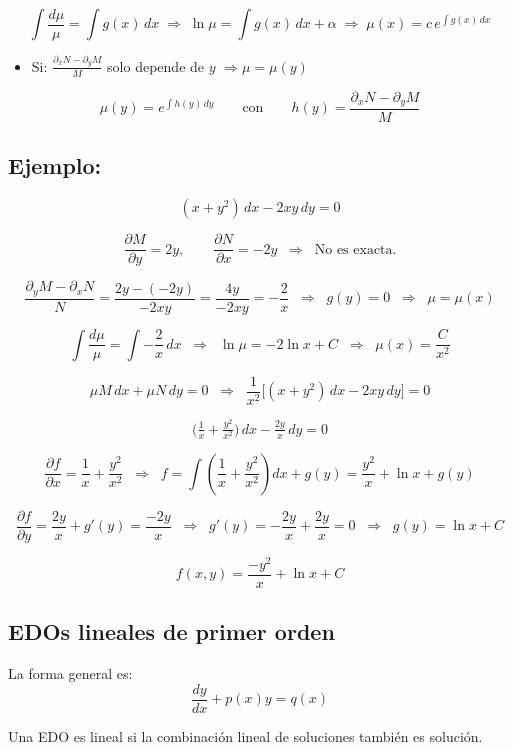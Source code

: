 \documentclass[a4paper,12pt]{article}
\begin{document}
\[
\int \frac{d\mu}{\mu}=\int g(x)\,dx
\;\Rightarrow\;
\ln\mu=\int g(x)\,dx+\alpha
\;\Rightarrow\;
\mu(x)=c\,e^{\int g(x)\,dx}
\]

\begin{itemize}
\item Si: $\displaystyle \frac{\partial_x N-\partial_y M}{M}$ solo depende de $y$ $\Rightarrow \mu=\mu(y)$
\end{itemize}

\[
\mu(y)=e^{\int h(y)\,dy}
\qquad\text{con}\qquad
h(y)=\frac{\partial_x N-\partial_y M}{M}
\]
\newpage
\subsection*{Ejemplo:}

\[
(x+y^2)\,dx - 2xy\,dy = 0
\]

\[
\frac{\partial M}{\partial y} = 2y, 
\qquad 
\frac{\partial N}{\partial x} = -2y
\;\;\Rightarrow\;\; \text{No es exacta.}
\]

\[
\frac{\partial_y M - \partial_x N}{N} = \frac{2y - (-2y)}{-2xy} = \frac{4y}{-2xy} = -\frac{2}{x}
\;\;\Rightarrow\;\; g(y)=0
\;\;\Rightarrow\;\; \mu=\mu(x)
\]

\[
\int \frac{d\mu}{\mu} = \int -\frac{2}{x}\,dx
\;\;\Rightarrow\;\;
\ln\mu = -2\ln x + C
\;\;\Rightarrow\;\;
\mu(x)=\frac{C}{x^2}
\]

\[
\mu M\,dx + \mu N\,dy = 0
\;\;\Rightarrow\;\;
\frac{1}{x^2}\big[(x+y^2)\,dx - 2xy\,dy\big]=0
\]

\[
\Big(\tfrac{1}{x}+\tfrac{y^2}{x^2}\Big)\,dx - \tfrac{2y}{x}\,dy=0
\]

\[
\frac{\partial f}{\partial x}=\frac{1}{x}+\frac{y^2}{x^2}
\;\;\Rightarrow\;\;
f=\int \left(\frac{1}{x}+\frac{y^2}{x^2}\right)dx + g(y)
= \frac{y^2}{x}+\ln x+g(y)
\]

\[
\frac{\partial f}{\partial y}=\frac{2y}{x}+g'(y)=\frac{-2y}{x}
\;\;\Rightarrow\;\;
g'(y)=-\frac{2y}{x}+\frac{2y}{x}=0
\;\;\Rightarrow\;\;
g(y)=\ln x+C
\]

\[
f(x,y)=\frac{-y^2}{x}+\ln x+C
\]

\subsection{EDOs lineales de primer orden}

La forma general es:
\[
\frac{dy}{dx}+p(x)y=q(x)
\]

Una EDO es lineal si la combinación lineal de soluciones también es solución.
\end{document}
